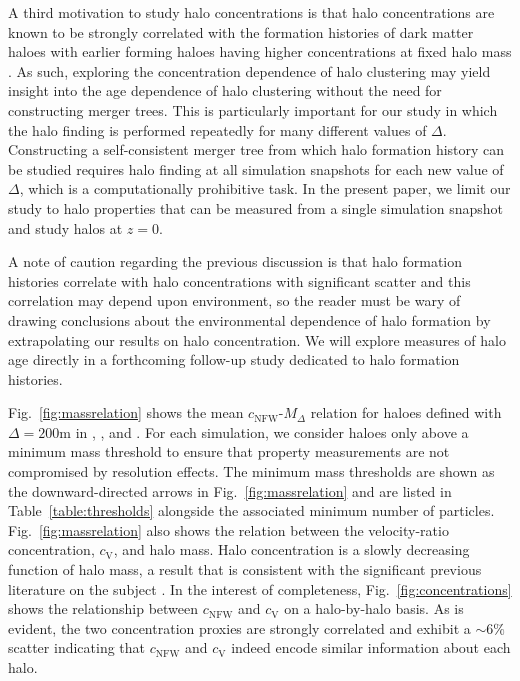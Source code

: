\documentclass[usenatbib,fleqn]{mnras}
\begin{document}
A third motivation to study halo concentrations is that halo concentrations are known to be strongly correlated with the formation histories of dark matter haloes with earlier forming haloes having higher concentrations at fixed halo mass \citep{wechsler_etal02, zhao_etal03, wechsler_etal06, zhao_etal09}. As such, exploring the concentration dependence of halo clustering may yield insight into the age dependence of halo clustering without the need for constructing merger trees. This is particularly important for our study in which the halo finding is performed repeatedly for many different values of $\Delta$. Constructing a self-consistent merger tree from which halo formation history can be studied requires halo finding at all simulation snapshots for each new value of $\Delta$, which is a computationally prohibitive task. In the present paper, we limit our study to halo properties that can be measured from a single simulation snapshot and study halos at $z=0$. 

A note of caution regarding the previous discussion is that halo formation histories correlate with halo concentrations with significant scatter and this correlation may depend upon environment, so the reader must be wary of drawing conclusions about the environmental dependence of halo formation by extrapolating our results on halo concentration. We will explore measures of halo age directly in a forthcoming follow-up study dedicated to halo formation histories.

Fig.~\ref{fig:massrelation} shows the mean $c_{\mathrm{NFW}}$-$M_{\Delta}$ relation for haloes defined with $\Delta=200$m in \simA, \simB, and \simC. For each simulation, we consider haloes only above a minimum mass threshold to ensure that property measurements are not compromised by resolution effects. The minimum mass thresholds are shown as the downward-directed arrows in Fig.~\ref{fig:massrelation} and are listed in Table~\ref{table:thresholds} alongside the associated minimum number of particles. Fig.~\ref{fig:massrelation} also shows the relation between the velocity-ratio concentration, $c_{\mathrm{V}}$, and halo mass. Halo concentration is a slowly decreasing function of halo mass, a result that is consistent with the significant previous literature on the subject \citep[e.g.,][and references therein]{bullock_etal01, maccio_etal07,duffy_etal08,prada_etal12,klypin_etal16}. In the interest of completeness, Fig.~\ref{fig:concentrations} shows the relationship between $c_{\mathrm{NFW}}$ and $c_{\mathrm{V}}$ on a halo-by-halo basis. As is evident, the two concentration proxies are strongly correlated and exhibit a $\sim 6\%$ scatter indicating that $c_{\mathrm{NFW}}$ and $c_{\mathrm{V}}$ indeed encode similar information about each halo. 
\end{document}
